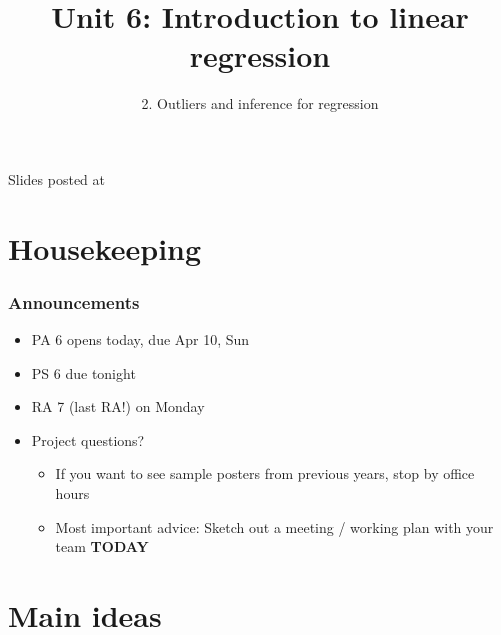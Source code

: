 \documentclass[slidestop,compress,mathserif,12pt,t,professionalfonts,xcolor=table]{beamer}
\title{Unit 6: Introduction to linear regression}
\subtitle{2. Outliers and inference for regression}
\author{\CourseName}
\date{}
\institute{\InstituteName}
\begin{document}



\begin{frame}[plain]

\titlepage

\vfill

{\scriptsize {} \hfill Slides posted at  \webURL{\CourseSite}}

\addtocounter{framenumber}{-1} 

\end{frame}


\section{Housekeeping}


\begin{frame}
\frametitle{Announcements}

\begin{itemize}

\item PA 6 opens today, due Apr 10, Sun

\item PS 6 due tonight

\item RA 7 (last RA!) on Monday

\item Project questions?
\begin{itemize}
\item If you want to see sample posters from previous years, stop by office hours
\item Most important advice: Sketch out a meeting / working plan with your team \textbf{TODAY}
\end{itemize}

\end{itemize}

\end{frame}


\section{Main ideas}
\end{document}
